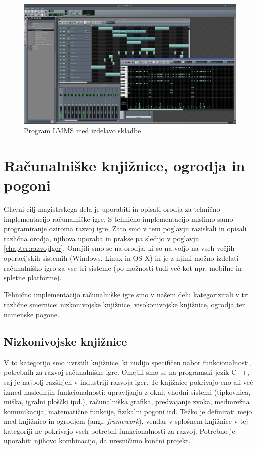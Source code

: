 \documentclass[12pt,a4paper,twoside]{book}
\begin{document}
\begin{figure}[h]
	\centering
	\includegraphics[width=12cm]{lmms}
	\caption{Program LMMS med izdelavo skladbe}
	\label{slika:lmms}
\end{figure}

\section{Računalniške knjižnice, ogrodja in pogoni}
Glavni cilj magistrskega dela je uporabiti in opisati orodja za tehnično implementacijo računalniške igre. S tehnično implementacijo mislimo samo programiranje oziroma razvoj igre. Zato smo v tem poglavju raziskali in opisali različna orodja, njihova uporaba in prakse pa sledijo v poglavju \ref{chapter:razvojIger}. Omejili smo se na orodja, ki so na voljo na vseh večjih operacijskih sistemih (Windows, Linux in OS X) in je z njimi možno izdelati računalniško igro za vse tri sisteme (po možnosti tudi več kot npr. mobilne in spletne platforme).

Tehnično implementacijo računalniške igre smo v našem delu kategorizirali v tri različne smernice: nizkonivojske knjižnice, visokonivojske knjižnice, ogrodja ter namenske pogone.

\subsection{Nizkonivojske knjižnice}
V to kategorijo smo uvrstili knjižnice, ki nudijo specifičen nabor funkcionalnosti, potrebnih za razvoj računalniške igre. Omejili smo se na programski jezik C++, saj je najbolj razširjen v industriji razvoja iger. Te knjižnice pokrivajo eno ali več izmed naslednjih funkcionalnosti: upravljanja z okni, vhodni sistemi (tipkovnica, miška, igralni ploščki ipd.), računalniška grafika, predvajanje zvoka, medmrežna komunikacija, matematične funkcije, fizikalni pogoni itd. Težko je definirati mejo med knjižnico in ogrodjem (angl. \textit{framework}), vendar v splošnem knjižnice v tej kategoriji ne pokrivajo vseh potrebni funkcionalnosti za razvoj. Potrebno je uporabiti njihovo kombinacijo, da uresničimo končni projekt.
\end{document}
